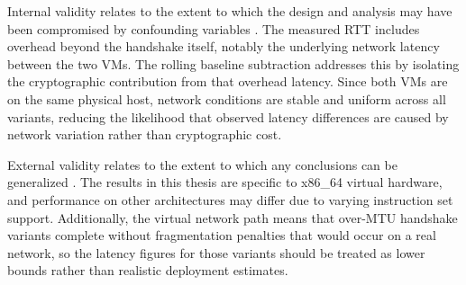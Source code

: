 Internal validity relates to the extent to which the design and analysis may have been compromised by confounding variables \cite{kitchenham2002}. The measured RTT includes overhead beyond the handshake itself, notably the underlying network latency between the two VMs. The rolling baseline subtraction addresses this by isolating the cryptographic contribution from that overhead latency. Since both VMs are on the same physical host, network conditions are stable and uniform across all variants, reducing the likelihood that observed latency differences are caused by network variation rather than cryptographic cost.

External validity relates to the extent to which any conclusions can be generalized \cite{kitchenham2002}. The results in this thesis are specific to x86\_64 virtual hardware, and performance on other architectures may differ due to varying instruction set support. Additionally, the virtual network path means that over-MTU handshake variants complete without fragmentation penalties that would occur on a real network, so the latency figures for those variants should be treated as lower bounds rather than realistic deployment estimates.
